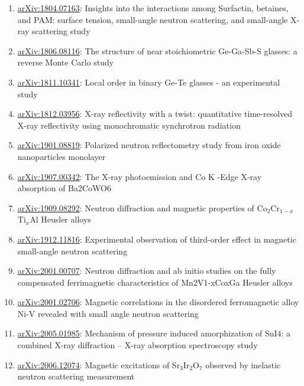 \begin{small}
\begin{enumerate}\setlength{\itemsep}{1pt}
  \item \href{https://arxiv.org/abs/1804.07163}{arXiv:1804.07163}: Insights into the interactions among Surfactin, betaines, and PAM: surface tension, small-angle neutron scattering, and small-angle X-ray scattering study
  \item \href{https://arxiv.org/abs/1806.08116}{arXiv:1806.08116}: The structure of near stoichiometric Ge-Ga-Sb-S glasses: a reverse Monte Carlo study
  \item \href{https://arxiv.org/abs/1811.10341}{arXiv:1811.10341}: Local order in binary Ge-Te glasses - an experimental study
  \item \href{https://arxiv.org/abs/1812.03956}{arXiv:1812.03956}: X-ray reflectivity with a twist: quantitative time-resolved X-ray reflectivity using monochromatic synchrotron radiation
  \item \href{https://arxiv.org/abs/1901.08819}{arXiv:1901.08819}: Polarized neutron reflectometry study from iron oxide nanoparticles monolayer
  \item \href{https://arxiv.org/abs/1907.00342}{arXiv:1907.00342}: The X-ray photoemission and Co K -Edge X-ray absorption of Ba2CoWO6
  \item \href{https://arxiv.org/abs/1909.08292}{arXiv:1909.08292}: Neutron diffraction and magnetic properties of Co$_2$Cr$_{1-x}$Ti$_x$Al Heusler alloys
  \item \href{https://arxiv.org/abs/1912.11816}{arXiv:1912.11816}: Experimental observation of third-order effect in magnetic small-angle neutron scattering
  \item \href{https://arxiv.org/abs/2001.00707}{arXiv:2001.00707}: Neutron diffraction and ab initio studies on the fully compensated ferrimagnetic characteristics of Mn2V1-xCoxGa Heusler alloys
  \item \href{https://arxiv.org/abs/2001.02706}{arXiv:2001.02706}: Magnetic correlations in the disordered ferromagnetic alloy Ni-V revealed with small angle neutron scattering
  \item \href{https://arxiv.org/abs/2005.01985}{arXiv:2005.01985}: Mechanism of pressure induced amorphization of SnI4: a combined X-ray diffraction -- X-ray absorption spectroscopy study
  \item \href{https://arxiv.org/abs/2006.12074}{arXiv:2006.12074}: Magnetic excitations of Sr$_3$Ir$_2$O$_7$ observed by inelastic neutron scattering measurement

\end{enumerate}
\end{small}
